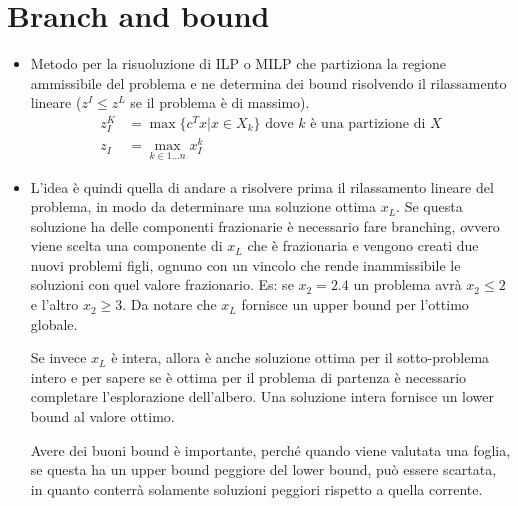 \section{Branch and bound}

\begin{itemize}
	\item Metodo per la risuoluzione di ILP o MILP che partiziona la regione ammissibile del problema e ne determina dei bound risolvendo il rilassamento lineare ($z^I \leq z^L$ se il problema è di massimo).
	\begin{align*}
		z_{I}^K &= \max \{ c^T x | x \in X_k \} \text{ dove $k$ è una partizione di $X$} \\
		z_I &= \max \limits_{k \in 1\ldots n} x_{I}^k
	\end{align*}
	\item L'idea è quindi quella di andare a risolvere prima il rilassamento lineare del problema, in modo da determinare una soluzione ottima $x_L$. Se questa soluzione ha delle componenti frazionarie è necessario fare branching, ovvero viene scelta una componente di $x_L$ che è frazionaria e vengono creati due nuovi problemi figli, ognuno con un vincolo che rende inammissibile le soluzioni con quel valore frazionario. Es: se $x_2 = 2.4$ un problema avrà $x_2 \leq 2$ e l'altro $x_2 \geq 3$.
	Da notare che $x_L$ fornisce un upper bound per l'ottimo globale.
	
	Se invece $x_L$ è intera, allora è anche soluzione ottima per il sotto-problema intero e per sapere se è ottima per il problema di partenza è necessario completare l'esplorazione dell'albero.
	Una soluzione intera fornisce un lower bound al valore ottimo.
	
	Avere dei buoni bound è importante, perché quando viene valutata una foglia, se questa ha un upper bound peggiore del lower bound, può essere scartata, in quanto conterrà solamente soluzioni peggiori rispetto a quella corrente.
	

\end{itemize}
